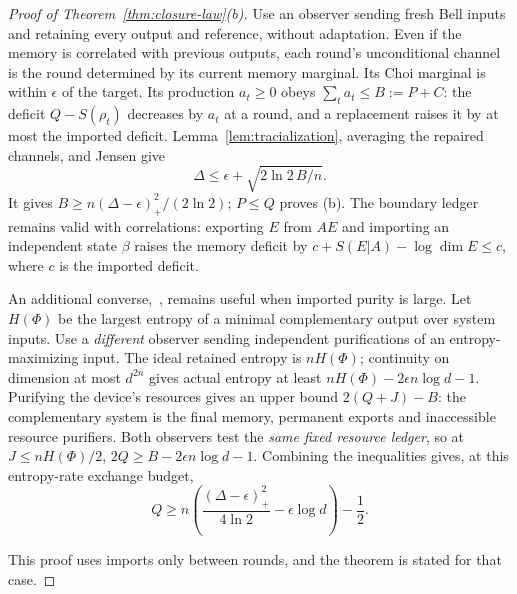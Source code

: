 \begin{proof}[Proof of Theorem~\ref{thm:closure-law}(b)]
Use an observer sending fresh Bell inputs and retaining every output and reference, without adaptation.
Even if the memory is correlated with previous outputs, each round's unconditional channel is the round determined by its current memory
marginal. Its Choi marginal is within $\epsilon$ of the target. Its production $a_t\ge0$ obeys
$\sum_ta_t\le B:=P+C$: the deficit $Q-S(\rho_t)$ decreases by $a_t$ at a round, and a replacement raises it by at most the imported deficit.
Lemma~\ref{lem:tracialization}, averaging the repaired channels, and Jensen give
\[
 \Delta\le\epsilon+\sqrt{2\ln2\,B/n}.
\]
It gives $B\ge n(\Delta-\epsilon)_+^2/(2\ln2)$; $P\le Q$ proves (b).
The boundary ledger remains valid with correlations: exporting $E$ from $AE$ and importing an independent state $\beta$
raises the memory deficit by $c+S(E|A)-\log\dim E\le c$, where $c$ is the imported deficit.

An additional converse,~\cite[Corollary~3.3(b)]{DouglasMghirbiB}, remains useful when imported purity is large. Let $H(\Phi)$ be the largest entropy of a minimal complementary output over system inputs. Use a \emph{different} observer sending independent purifications of an entropy-maximizing input.
The ideal retained entropy is $nH(\Phi)$; continuity on dimension at most $d^{2n}$ gives actual entropy at least
$nH(\Phi)-2\epsilon n\log d-1$.
Purifying the device's resources gives an upper bound $2(Q+J)-B$: the complementary system is the final memory, permanent exports
and inaccessible resource purifiers. Both observers test the \emph{same fixed resource ledger}, so at $J\le nH(\Phi)/2$,
$2Q\ge B-2\epsilon n\log d-1$. Combining the inequalities gives, at this entropy-rate exchange budget,
\[
 Q\ge n\left(\frac{(\Delta-\epsilon)_+^2}{4\ln2}-\epsilon\log d\right)-\frac12.
\]

This proof uses imports only between rounds, and the theorem is stated for that case.
\end{proof}

